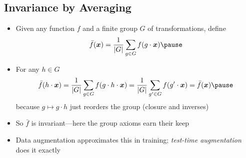 
\Outline %

\begin{slide}
\section[-2]{Invariance by Averaging}

\begin{PauseHighLight}
  \begin{itemize}\squeeze
  \item Given any function $f$ and a finite group $G$ of
    transformations, define
    \begin{align*}
      \bar{f}(\bm{x}) = \frac{1}{|G|}\sum_{g\in G} f(g\cdot\bm{x})\pause
    \end{align*}
  \item For any $h\in G$
    \begin{align*}
      \bar{f}(h\cdot\bm{x}) = \frac{1}{|G|}\sum_{g\in G} f(g\cdot h\cdot\bm{x})
      = \frac{1}{|G|}\sum_{g'\in G} f(g'\cdot\bm{x}) = \bar{f}(\bm{x})\pause
    \end{align*}
    because $g\mapsto g\cdot h$ just reorders the group (closure and
    inverses)\pause
  \item So $\bar{f}$ is invariant\pause{}---here the group axioms earn
    their keep\pauseb
  \item Data augmentation approximates this in training;
    \emph{test-time augmentation} does it exactly\pause
  \end{itemize}
\end{PauseHighLight}

\end{slide}

